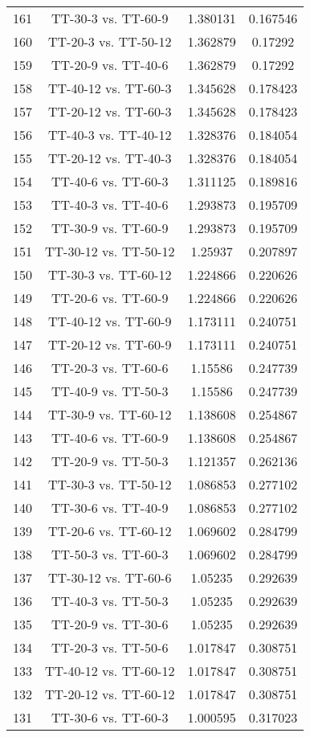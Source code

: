 \documentclass[a4paper,10pt]{article}
\begin{document}
\begin{landscape}
\begin{table}[!htp]
\begin{tabular}{cccc}
161&TT-30-3 vs. TT-60-9&1.380131&0.167546\\
160&TT-20-3 vs. TT-50-12&1.362879&0.17292\\
159&TT-20-9 vs. TT-40-6&1.362879&0.17292\\
158&TT-40-12 vs. TT-60-3&1.345628&0.178423\\
157&TT-20-12 vs. TT-60-3&1.345628&0.178423\\
156&TT-40-3 vs. TT-40-12&1.328376&0.184054\\
155&TT-20-12 vs. TT-40-3&1.328376&0.184054\\
154&TT-40-6 vs. TT-60-3&1.311125&0.189816\\
153&TT-40-3 vs. TT-40-6&1.293873&0.195709\\
152&TT-30-9 vs. TT-60-9&1.293873&0.195709\\
151&TT-30-12 vs. TT-50-12&1.25937&0.207897\\
150&TT-30-3 vs. TT-60-12&1.224866&0.220626\\
149&TT-20-6 vs. TT-60-9&1.224866&0.220626\\
148&TT-40-12 vs. TT-60-9&1.173111&0.240751\\
147&TT-20-12 vs. TT-60-9&1.173111&0.240751\\
146&TT-20-3 vs. TT-60-6&1.15586&0.247739\\
145&TT-40-9 vs. TT-50-3&1.15586&0.247739\\
144&TT-30-9 vs. TT-60-12&1.138608&0.254867\\
143&TT-40-6 vs. TT-60-9&1.138608&0.254867\\
142&TT-20-9 vs. TT-50-3&1.121357&0.262136\\
141&TT-30-3 vs. TT-50-12&1.086853&0.277102\\
140&TT-30-6 vs. TT-40-9&1.086853&0.277102\\
139&TT-20-6 vs. TT-60-12&1.069602&0.284799\\
138&TT-50-3 vs. TT-60-3&1.069602&0.284799\\
137&TT-30-12 vs. TT-60-6&1.05235&0.292639\\
136&TT-40-3 vs. TT-50-3&1.05235&0.292639\\
135&TT-20-9 vs. TT-30-6&1.05235&0.292639\\
134&TT-20-3 vs. TT-50-6&1.017847&0.308751\\
133&TT-40-12 vs. TT-60-12&1.017847&0.308751\\
132&TT-20-12 vs. TT-60-12&1.017847&0.308751\\
131&TT-30-6 vs. TT-60-3&1.000595&0.317023\\

\end{tabular}
\end{table}
\end{landscape}
\end{document}
